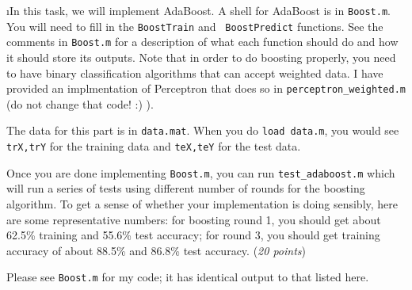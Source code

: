 \documentclass[fleqn]{article}
\begin{document}
\i In this task, we will implement AdaBoost.  A shell for AdaBoost is in
{\tt Boost.m}.  You will need to fill in the {\tt BoostTrain} and {\tt
  BoostPredict} functions.  See the comments in {\tt Boost.m} for a
description of what each function should do and how it should store
its outputs.  Note that in order to do boosting properly, you need to
have binary classification algorithms that can accept weighted data.
I have provided an implmentation of Perceptron that does so in
{\tt perceptron\_weighted.m} (do not change that code! :) ).

The data for this part is in {\tt data.mat}. When you do {\tt load data.m},
you would see {\tt trX,trY} for the training data and {\tt teX,teY} for
the test data.

Once you are done implementing {\tt Boost.m}, you can run {\tt test\_adaboost.m} 
which will run a series of tests using different number of rounds for the boosting 
algorithm. To get a sense of whether your implementation is doing sensibly, 
here are some representative numbers: for boosting round 1, you should get 
about 62.5\% training and 55.6\% test accuracy; for round 3, you should 
get training accuracy of about 88.5\% and 86.8\% test accuracy.
(\emph{20 points})

\begin{solution}
Please see \texttt{Boost.m} for my code; it has identical output to that listed here.
\end{solution}

\ene
\end{document}
